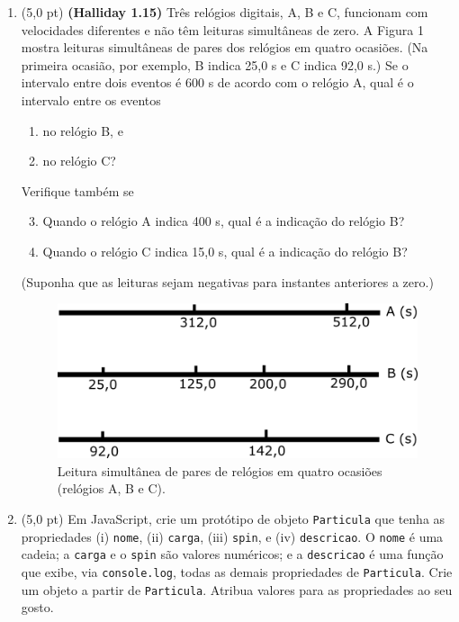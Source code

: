 \documentclass[12pt,a4paper,oneside]{article}
\begin{document}
\begin{enumerate}

	\item (5,0 pt) {\bf (Halliday 1.15)} Três relógios digitais, A, B e C, funcionam com velocidades diferentes e não têm leituras simultâneas de zero. A Figura 1 mostra leituras simultâneas de pares dos relógios em quatro ocasiões. (Na primeira ocasião, por exemplo, B indica 25,0 s e C indica 92,0 s.) Se o intervalo entre dois eventos é 600 s de acordo com o relógio A, qual é o intervalo entre os eventos 
		\begin{enumerate}
			\item no relógio B, e
			\item no relógio C?
		\end{enumerate}
	Verifique também se
		\begin{enumerate}
			\setcounter{enumii}{2}
			\item Quando o relógio A indica 400 s, qual é a indicação do relógio B?
			\item Quando o relógio C indica 15,0 s, qual é a indicação do relógio B?
		\end{enumerate}
	(Suponha que as leituras sejam negativas para instantes anteriores a zero.)
	
	\begin{center}
		\begin{figure}[htb]
			\centering		
			\includegraphics[scale=0.4]{images/hal13.png}
			\caption{Leitura simultânea de pares de relógios em quatro ocasiões (relógios A, B e C).}
		\end{figure}
	\end{center}
	
	\item (5,0 pt) Em JavaScript, crie um protótipo de objeto {\tt Particula} que tenha as propriedades (i) {\tt nome}, (ii) {\tt carga}, (iii) {\tt spin}, e (iv) {\tt descricao}. O {\tt nome} é uma cadeia; a {\tt carga} e o {\tt spin} são valores numéricos; e a {\tt descricao} é uma função que exibe, via {\tt console.log}, todas as demais propriedades de {\tt Particula}. Crie um objeto a partir de {\tt Particula}. Atribua valores para as propriedades ao seu gosto.
	
	\end{enumerate}
\end{document}

